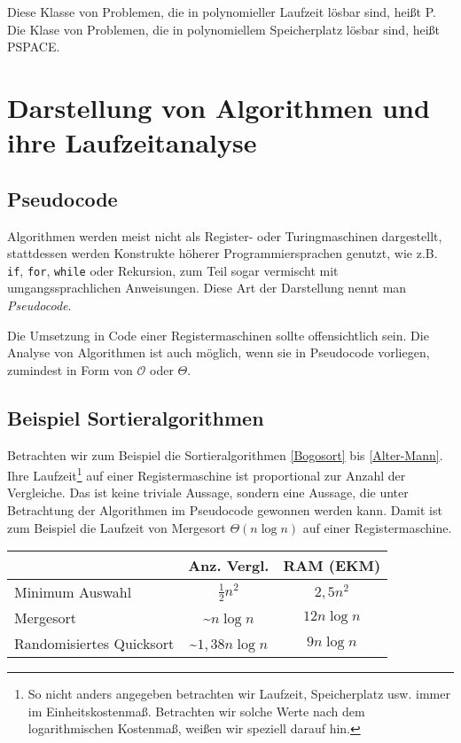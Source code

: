 \begin{Bem}
\hspace{\parindent}Diese Klasse von Problemen, die in polynomieller Laufzeit lösbar sind, heißt \textsf{P}. Die Klase von Problemen, die in polynomiellem Speicherplatz lösbar sind, heißt \textsf{PSPACE}.
\end{Bem}

\section{Darstellung von Algorithmen und ihre Laufzeitanalyse}
\subsection{Pseudocode}
Algorithmen werden meist nicht als Register- oder Turingmaschinen dargestellt, stattdessen werden Konstrukte höherer Programmiersprachen genutzt, wie z.B. \texttt{if}, \texttt{for}, \texttt{while} oder Rekursion, zum Teil sogar vermischt mit umgangssprachlichen Anweisungen. Diese Art der Darstellung nennt man \textit{Pseudocode}.

Die Umsetzung in Code einer Registermaschinen sollte offensichtlich sein. Die Analyse von Algorithmen ist auch möglich, wenn sie in Pseudocode vorliegen, zumindest in Form von $\mathcal{O}$ oder $\Theta$.

\subsection{Beispiel Sortieralgorithmen}
Betrachten wir zum Beispiel die Sortieralgorithmen \ref{Bogosort} bis \ref{Alter-Mann}. Ihre Laufzeit\footnote{So nicht anders angegeben betrachten wir Laufzeit, Speicherplatz usw. immer im Einheitskostenmaß. Betrachten wir solche Werte nach dem logarithmischen Kostenmaß, weißen wir speziell darauf hin.} auf einer Registermaschine ist proportional zur Anzahl der Vergleiche. Das ist keine triviale Aussage, sondern eine Aussage, die unter Betrachtung der Algorithmen im Pseudocode gewonnen werden kann. Damit ist zum Beispiel die Laufzeit von Mergesort $\Theta(n \log{n})$ auf einer Registermaschine.

\begin{center}
\begin{tabular}{lcc}
 & Anz. Vergl. & RAM (EKM) \\\hline\hline
Minimum Auswahl & $ \frac{1}{2} n^2 $ & $2{,}5 n^2$ \\
Mergesort & \textasciitilde $n \log{n}$ & $12 n \log{n}$ \\
Randomisiertes Quicksort & \textasciitilde  $1{,}38 n\log{n}$ & $9 n \log{n}$ \\\hline\hline
\end{tabular}
\end{center}

